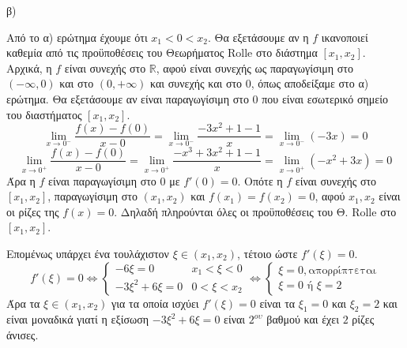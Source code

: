 \begin{alist}
\item β)
\begin{rlist}
    \item Από το α) ερώτημα έχουμε ότι $x_1 < 0 < x_2$.
    Θα εξετάσουμε αν η $f$ ικανοποιεί καθεμία από τις προϋποθέσεις του Θεωρήματος Rolle στο διάστημα $[x_1, x_2]$.
    Αρχικά, η $f$ είναι συνεχής στο $\mathbb{R}$, αφού είναι συνεχής ως παραγωγίσιμη στο $(-\infty, 0)$ και στο $(0, +\infty)$ και συνεχής και στο $0$, όπως αποδείξαμε στο α) ερώτημα.
    Θα εξετάσουμε αν είναι παραγωγίσιμη στο $0$ που είναι εσωτερικό σημείο του διαστήματος $[x_1, x_2]$.
    \[ \lim_{x \to 0^-} \frac{f(x)-f(0)}{x-0} = \lim_{x \to 0^-} \frac{-3x^2+1-1}{x} = \lim_{x \to 0^-} (-3x) = 0 \]
    \[ \lim_{x \to 0^+} \frac{f(x)-f(0)}{x-0} = \lim_{x \to 0^+} \frac{-x^3+3x^2+1-1}{x} = \lim_{x \to 0^+} (-x^2+3x) = 0 \]
    Άρα η $f$ είναι παραγωγίσιμη στο $0$ με $f'(0)=0$.
    Οπότε η $f$ είναι συνεχής στο $[x_1, x_2]$, παραγωγίσιμη στο $(x_1, x_2)$ και $f(x_1)=f(x_2)=0$, αφού $x_1, x_2$ είναι οι ρίζες της $f(x)=0$. Δηλαδή πληρούνται όλες οι προϋποθέσεις του Θ. Rolle στο $[x_1, x_2]$.

    \item Επομένως υπάρχει ένα τουλάχιστον $\xi \in (x_1, x_2)$, τέτοιο ώστε $f'(\xi)=0$.
    \[ f'(\xi) = 0 \Leftrightarrow \begin{cases} -6\xi = 0 & x_1 < \xi < 0 \\ -3\xi^2+6\xi = 0 & 0 < \xi < x_2 \end{cases} \Leftrightarrow \begin{cases} \xi = 0, \text{απορρίπτεται} \\ \xi = 0 \text{ ή } \xi = 2 \end{cases} \]
    Άρα τα $\xi \in (x_1, x_2)$ για τα οποία ισχύει $f'(\xi)=0$ είναι τα $\xi_1=0$ και $\xi_2=2$ και είναι μοναδικά γιατί η εξίσωση $-3\xi^2+6\xi=0$ είναι $2^{ου}$ βαθμού και έχει $2$ ρίζες άνισες.
\end{rlist}


\end{alist}
